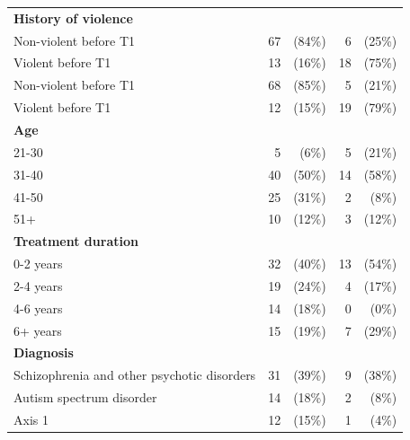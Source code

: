 \documentclass[a4paper,11pt]{article}
\begin{document}
\begin{table}[H]
\begin{tabular}{lr@{\hspace{\tabcolsep}}r@{\hspace{3\tabcolsep}}r@{\hspace{\tabcolsep}}r}
\textbf{History of violence} &&&\\ 
\hspace{3mm}   Non-violent before T1   &        67 & (84\%)   &   6 & (25\%) \\
\hspace{3mm}   Violent before T1   &        13 & (16\%)   &   18 & (75\%) \\
\hspace{3mm}   Non-violent before T1   &        68 & (85\%)   &   5 & (21\%) \\
\hspace{3mm}   Violent before T1   &        12 & (15\%)   &   19 & (79\%) \\
\textbf{Age} &&&\\ 
\hspace{3mm}   21-30   &        5 & (6\%)   &   5 & (21\%) \\
\hspace{3mm}   31-40   &        40 & (50\%)   &   14 & (58\%) \\
\hspace{3mm}   41-50   &        25 & (31\%)   &   2 & (8\%) \\
\hspace{3mm}   51+   &        10 & (12\%)   &   3 & (12\%) \\
\textbf{Treatment duration} &&&\\ 
\hspace{3mm}   0-2 years   &        32 & (40\%)   &   13 & (54\%) \\
\hspace{3mm}   2-4 years   &        19 & (24\%)   &   4 & (17\%) \\
\hspace{3mm}   4-6 years   &        14 & (18\%)   &   0 & (0\%) \\
\hspace{3mm}   6+ years   &        15 & (19\%)   &   7 & (29\%) \\
\textbf{Diagnosis} &&&\\ 
\hspace{3mm}   Schizophrenia and other psychotic disorders   &        31 & (39\%)   &   9 & (38\%) \\
\hspace{3mm}   Autism spectrum disorder   &        14 & (18\%)   &   2 & (8\%) \\
\hspace{3mm}   Axis 1   &        12 & (15\%)   &   1 & (4\%) \\

\end{tabular}
\end{table}
\end{document}
